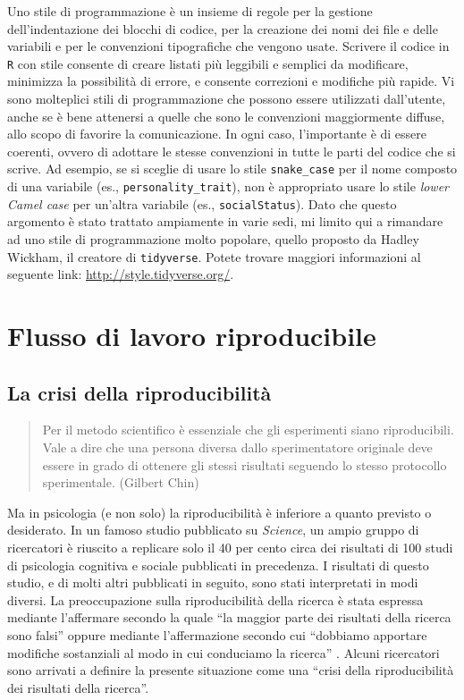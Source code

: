 \documentclass[
]{memoir}
\theoremstyle{definition}
\theoremstyle{definition}
\theoremstyle{definition}
\theoremstyle{definition}
\theoremstyle{remark}
\begin{document}
Uno stile di programmazione è un insieme di regole per la gestione dell'indentazione dei blocchi di codice, per la creazione dei nomi dei file e delle variabili e per le convenzioni tipografiche che vengono usate. Scrivere il codice in \texttt{R} con stile consente di creare listati più leggibili e semplici da modificare, minimizza la possibilità di errore, e consente correzioni e modifiche più rapide. Vi sono molteplici stili di programmazione che possono essere utilizzati dall'utente, anche se è bene attenersi a quelle che sono le convenzioni maggiormente diffuse, allo scopo di favorire la comunicazione. In ogni caso, l'importante è di essere coerenti, ovvero di adottare le stesse convenzioni in tutte le parti del codice che si scrive. Ad esempio, se si sceglie di usare lo stile \texttt{snake\_case} per il nome composto di una variabile (es., \texttt{personality\_trait}), non è appropriato usare lo stile \emph{lower Camel case} per un'altra variabile (es., \texttt{socialStatus}). Dato che questo argomento è stato trattato ampiamente in varie sedi, mi limito qui a rimandare ad uno stile di programmazione molto popolare, quello proposto da Hadley Wickham, il creatore di \texttt{tidyverse}. Potete trovare maggiori informazioni al seguente link: \url{http://style.tidyverse.org/}.

\hypertarget{flusso-di-lavoro-riproducibile}{%
\section{Flusso di lavoro riproducibile}\label{flusso-di-lavoro-riproducibile}}

\hypertarget{la-crisi-della-riproducibilituxe0}{%
\subsection{La crisi della riproducibilità}\label{la-crisi-della-riproducibilituxe0}}

\begin{quote}
Per il metodo scientifico è essenziale che gli esperimenti siano riproducibili. Vale a dire che una persona diversa dallo sperimentatore originale deve essere in grado di ottenere gli stessi risultati seguendo lo stesso protocollo sperimentale. (Gilbert Chin)
\end{quote}

Ma in psicologia (e non solo) la riproducibilità è inferiore a quanto previsto o desiderato. In un famoso studio pubblicato su \emph{Science}, un ampio gruppo di ricercatori \citep{open2015estimating} è riuscito a replicare solo il 40 per cento circa dei risultati di 100 studi di psicologia cognitiva e sociale pubblicati in precedenza. I risultati di questo studio, e di molti altri pubblicati in seguito, sono stati interpretati in modi diversi. La preoccupazione sulla riproducibilità della ricerca è stata espressa mediante l'affermare secondo la quale ``la maggior parte dei risultati della ricerca sono falsi'' \citep{ioannidis2005most} oppure mediante l'affermazione secondo cui ``dobbiamo apportare modifiche sostanziali al modo in cui conduciamo la ricerca'' \citep{cumming2014new}. Alcuni ricercatori sono arrivati a definire la presente situazione come una ``crisi della riproducibilità dei risultati della ricerca''.
\end{document}
